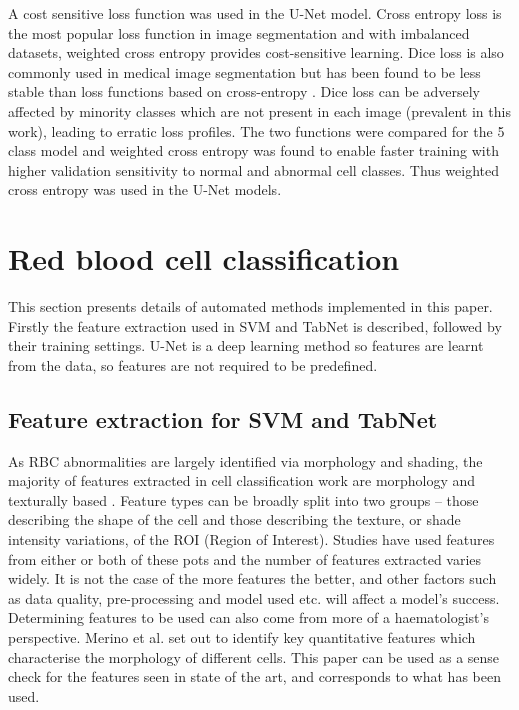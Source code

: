 \documentclass[final,5p,times,twocolumn,authoryear]{elsarticle}
\begin{document}
A cost sensitive loss function was used in the U-Net model. Cross entropy loss is the most popular loss function in image segmentation \citep{AsgariTaghanaki2020DeepReview} and with imbalanced datasets, weighted cross entropy provides cost-sensitive learning. Dice loss is also commonly used in medical image segmentation but has been found to be less stable than loss functions based on cross-entropy \citep{AsgariTaghanaki2020DeepReview}. Dice loss can be adversely affected by minority classes which are not present in each image (prevalent in this work), leading to erratic loss profiles. The two functions were compared for the 5 class model and weighted cross entropy was found to enable faster training with higher validation sensitivity to normal and abnormal cell classes. Thus weighted cross entropy was used in the U-Net models.



\section{Red blood cell classification}
\label{sec:classification}

This section presents details of automated methods implemented in this paper. Firstly the feature extraction used in SVM and TabNet is described, followed by their training settings. U-Net is a deep learning method so features are learnt from the data, so features are not required to be predefined.

\subsection{Feature extraction for SVM and TabNet}
\label{subsec:f_extraction}

As RBC abnormalities are largely identified via morphology and shading, the majority of features extracted in cell classification work are morphology and texturally based \citep{Shirazi2018ExtremeClassification}. Feature types can be broadly split into two groups – those describing the shape of the cell and those describing the texture, or shade intensity variations, of the ROI (Region of Interest). Studies have used features from either or both of these pots and the number of features extracted varies widely. It is not the case of the more features the better, and other factors such as data quality, pre-processing and model used etc. will affect a model’s success. Determining features to be used can also come from more of a haematologist’s perspective. Merino et al. \citep{Merino2018OptimizingAnalysis} set out to identify key quantitative features which characterise the morphology of different cells. This paper can be used as a sense check for the features seen in state of the art, and corresponds to what has been used.
\end{document}
